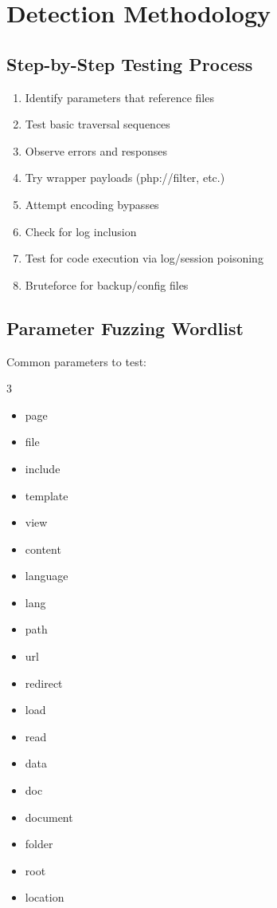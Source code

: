 \documentclass[12pt]{article}
\begin{document}
\section{Detection Methodology}

\subsection{Step-by-Step Testing Process}

\begin{enumerate}
    \item Identify parameters that reference files
    \item Test basic traversal sequences
    \item Observe errors and responses
    \item Try wrapper payloads (php://filter, etc.)
    \item Attempt encoding bypasses
    \item Check for log inclusion
    \item Test for code execution via log/session poisoning
    \item Bruteforce for backup/config files
\end{enumerate}

\subsection{Parameter Fuzzing Wordlist}

Common parameters to test:

\begin{multicols}{3}
\begin{itemize}
    \item page
    \item file
    \item include
    \item template
    \item view
    \item content
    \item language
    \item lang
    \item path
    \item url
    \item redirect
    \item load
    \item read
    \item data
    \item doc
    \item document
    \item folder
    \item root
    \item location
\end{itemize}
\end{multicols}
\end{document}
